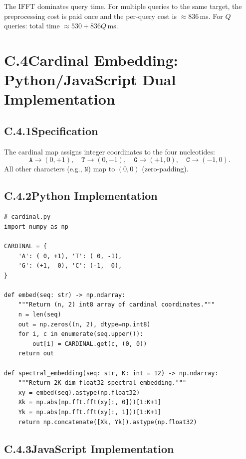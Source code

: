 \noindent
The IFFT dominates query time. For multiple queries to the same target,
the preprocessing cost is paid once and the per-query cost is $\approx 836$\,ms.
For $Q$ queries: total time $\approx 530 + 836Q$\,ms.

\section*{C.4\quad Cardinal Embedding: Python/JavaScript Dual Implementation}
\label{app:cardinal}

\subsection*{C.4.1\quad Specification}

The cardinal map assigns integer coordinates to the four nucleotides:
\[
  \mathtt{A} \to (0, +1),\quad \mathtt{T} \to (0, -1),\quad
  \mathtt{G} \to (+1, 0),\quad \mathtt{C} \to (-1, 0).
\]
All other characters (e.g., $\mathtt{N}$) map to $(0, 0)$ (zero-padding).

\subsection*{C.4.2\quad Python Implementation}

\begin{verbatim}
# cardinal.py
import numpy as np

CARDINAL = {
    'A': ( 0, +1), 'T': ( 0, -1),
    'G': (+1,  0), 'C': (-1,  0),
}

def embed(seq: str) -> np.ndarray:
    """Return (n, 2) int8 array of cardinal coordinates."""
    n = len(seq)
    out = np.zeros((n, 2), dtype=np.int8)
    for i, c in enumerate(seq.upper()):
        out[i] = CARDINAL.get(c, (0, 0))
    return out

def spectral_embedding(seq: str, K: int = 12) -> np.ndarray:
    """Return 2K-dim float32 spectral embedding."""
    xy = embed(seq).astype(np.float32)
    Xk = np.abs(np.fft.fft(xy[:, 0]))[1:K+1]
    Yk = np.abs(np.fft.fft(xy[:, 1]))[1:K+1]
    return np.concatenate([Xk, Yk]).astype(np.float32)
\end{verbatim}

\subsection*{C.4.3\quad JavaScript Implementation}

